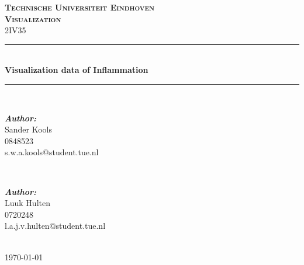 \documentclass[a4paper,twoside,11pt]{article}
\newcommand{\HRule}{\rule{\linewidth}{0.5mm}} %
\begin{document}
\begin{titlepage}

\center %

\textsc{\Huge \textbf{Technische Universiteit Eindhoven}}\\[1.5cm] %
\textsc{\LARGE \textbf{Visualization}}\\[0.5cm] %
\textsc{\large 2IV35}\\[0.5cm] %

\HRule \\[0.4cm]
{ \huge \bfseries Visualization data of Inflammation}\\[0.4cm] %
\HRule \\[1.5cm]

\begin{minipage}{0.4\textwidth}
\begin{flushleft} \large
\emph{\textbf{Author:}}\\
Sander Kools \\
0848523 \\
s.w.a.kools@student.tue.nl %
\end{flushleft}
\end{minipage}
~
\begin{minipage}{0.4\textwidth}
\begin{flushright} \large
\emph{\textbf{Author:}}\\
Luuk Hulten\\
0720248 \\
l.a.j.v.hulten@student.tue.nl
\end{flushright}
\end{minipage}\\[4cm]

{\large \today}\\[3cm] %

\vfill %

\end{titlepage}
\end{document}
